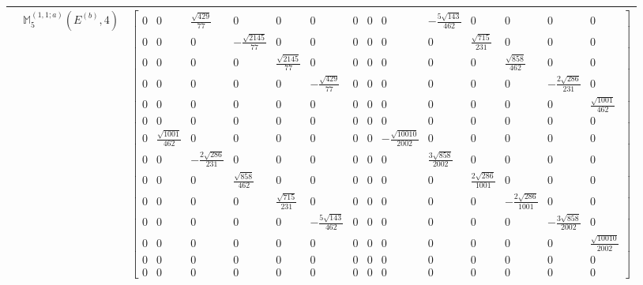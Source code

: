 \documentclass[fleqn,8pt,landscape]{jsarticle}
\begin{document}
\begin{longtable}{ccc}
$  $ & $ \mathbb{M}_{5}^{(1,1;a)}(E^{(b)},4) $ & $ \begin{bmatrix} 0 & 0 & \frac{\sqrt{429}}{77} & 0 & 0 & 0 & 0 & 0 & 0 & - \frac{5 \sqrt{143}}{462} & 0 & 0 & 0 & 0 \\ 0 & 0 & 0 & - \frac{\sqrt{2145}}{77} & 0 & 0 & 0 & 0 & 0 & 0 & \frac{\sqrt{715}}{231} & 0 & 0 & 0 \\ 0 & 0 & 0 & 0 & \frac{\sqrt{2145}}{77} & 0 & 0 & 0 & 0 & 0 & 0 & \frac{\sqrt{858}}{462} & 0 & 0 \\ 0 & 0 & 0 & 0 & 0 & - \frac{\sqrt{429}}{77} & 0 & 0 & 0 & 0 & 0 & 0 & - \frac{2 \sqrt{286}}{231} & 0 \\ 0 & 0 & 0 & 0 & 0 & 0 & 0 & 0 & 0 & 0 & 0 & 0 & 0 & \frac{\sqrt{1001}}{462} \\ 0 & 0 & 0 & 0 & 0 & 0 & 0 & 0 & 0 & 0 & 0 & 0 & 0 & 0 \\ 0 & \frac{\sqrt{1001}}{462} & 0 & 0 & 0 & 0 & 0 & 0 & - \frac{\sqrt{10010}}{2002} & 0 & 0 & 0 & 0 & 0 \\ 0 & 0 & - \frac{2 \sqrt{286}}{231} & 0 & 0 & 0 & 0 & 0 & 0 & \frac{3 \sqrt{858}}{2002} & 0 & 0 & 0 & 0 \\ 0 & 0 & 0 & \frac{\sqrt{858}}{462} & 0 & 0 & 0 & 0 & 0 & 0 & \frac{2 \sqrt{286}}{1001} & 0 & 0 & 0 \\ 0 & 0 & 0 & 0 & \frac{\sqrt{715}}{231} & 0 & 0 & 0 & 0 & 0 & 0 & - \frac{2 \sqrt{286}}{1001} & 0 & 0 \\ 0 & 0 & 0 & 0 & 0 & - \frac{5 \sqrt{143}}{462} & 0 & 0 & 0 & 0 & 0 & 0 & - \frac{3 \sqrt{858}}{2002} & 0 \\ 0 & 0 & 0 & 0 & 0 & 0 & 0 & 0 & 0 & 0 & 0 & 0 & 0 & \frac{\sqrt{10010}}{2002} \\ 0 & 0 & 0 & 0 & 0 & 0 & 0 & 0 & 0 & 0 & 0 & 0 & 0 & 0 \\ 0 & 0 & 0 & 0 & 0 & 0 & 0 & 0 & 0 & 0 & 0 & 0 & 0 & 0 \end{bmatrix} $ \\ \hline
\end{longtable}
\end{document}
